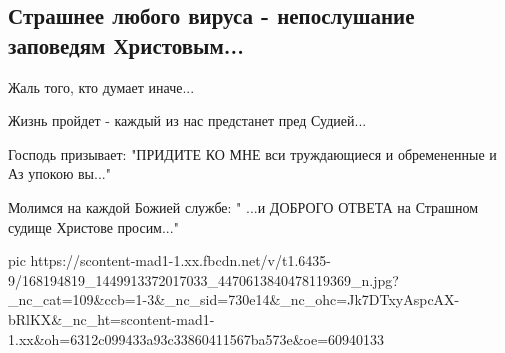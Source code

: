  
 
 
 
 

\subsection{Страшнее любого вируса - непослушание заповедям Христовым...}
\label{sec:02_04_2021.fb.maslov_evgenij.1.zapovedi}

Жаль того, кто думает иначе...

Жизнь пройдет - каждый из нас предстанет пред Судией...

Господь призывает: "ПРИДИТЕ КО МНЕ вси труждающиеся и обремененные и Аз упокою
вы..."

Молимся на каждой Божией службе: " ...и ДОБРОГО ОТВЕТА на Страшном судище
Христове просим..."

\ifcmt
  pic https://scontent-mad1-1.xx.fbcdn.net/v/t1.6435-9/168194819_1449913372017033_4470613840478119369_n.jpg?_nc_cat=109&ccb=1-3&_nc_sid=730e14&_nc_ohc=Jk7DTxyAspcAX-bRlKX&_nc_ht=scontent-mad1-1.xx&oh=6312c099433a93c33860411567ba573e&oe=60940133
\fi


